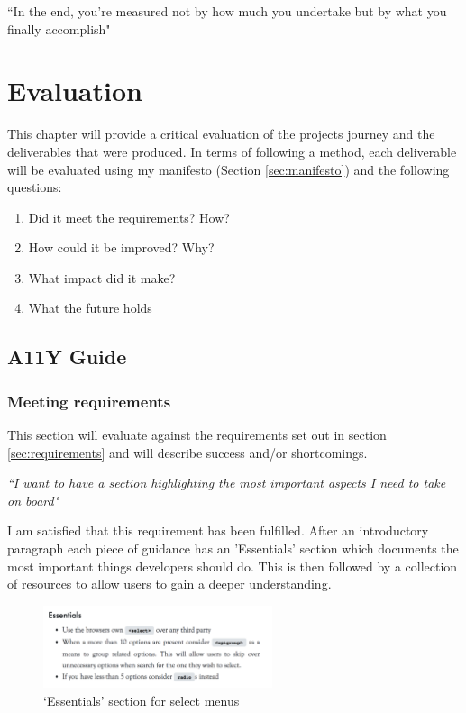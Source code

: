 \begin{savequote}[75mm]
``In the end, you're measured not by how much you undertake but by what you
finally accomplish"
\end{savequote}

\chapter{Evaluation}
This chapter will provide a critical evaluation of the projects journey and
the deliverables that were produced. In terms of following a method, each
deliverable will be evaluated using my manifesto (Section
\ref{sec:manifesto}) and the following questions:
\begin{enumerate}
\item Did it meet the requirements? How?
\item How could it be improved? Why?
\item What impact did it make?
\item What the future holds
\end{enumerate}

\section{A11Y Guide}
\subsection{Meeting requirements}
This section will evaluate against the requirements set out in section
\ref{sec:requirements} and will describe success and/or shortcomings.

\begin{center}
\textit{``I want to have a section highlighting the most important aspects I
need to take on board"}
\end{center}
I am satisfied that this requirement has been fulfilled. After an
introductory paragraph each piece of guidance has an 'Essentials' section
which documents the most important things developers should do. This is then followed
by a collection of resources to allow users to gain a deeper understanding.
\begin{figure}[H]
\centering
\includegraphics[width=0.6\textwidth]{figures/guide_essentials}
\captionsetup{justification=centering}
\caption{`Essentials' section for select menus
\label{fig:guide_essentials}}
\end{figure}

